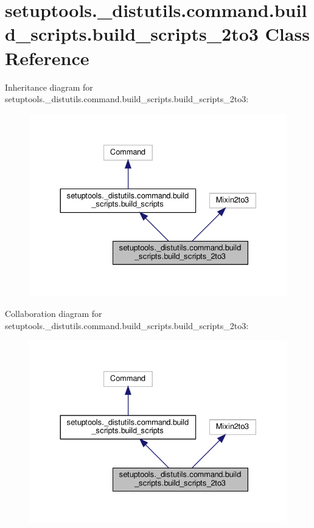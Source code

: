 \hypertarget{classsetuptools_1_1__distutils_1_1command_1_1build__scripts_1_1build__scripts__2to3}{}\section{setuptools.\+\_\+distutils.\+command.\+build\+\_\+scripts.\+build\+\_\+scripts\+\_\+2to3 Class Reference}
\label{classsetuptools_1_1__distutils_1_1command_1_1build__scripts_1_1build__scripts__2to3}


Inheritance diagram for setuptools.\+\_\+distutils.\+command.\+build\+\_\+scripts.\+build\+\_\+scripts\+\_\+2to3\+:
\nopagebreak
\begin{figure}[H]
\begin{center}
\leavevmode
\includegraphics[width=330pt]{classsetuptools_1_1__distutils_1_1command_1_1build__scripts_1_1build__scripts__2to3__inherit__graph}
\end{center}
\end{figure}


Collaboration diagram for setuptools.\+\_\+distutils.\+command.\+build\+\_\+scripts.\+build\+\_\+scripts\+\_\+2to3\+:
\nopagebreak
\begin{figure}[H]
\begin{center}
\leavevmode
\includegraphics[width=330pt]{classsetuptools_1_1__distutils_1_1command_1_1build__scripts_1_1build__scripts__2to3__coll__graph}
\end{center}
\end{figure}
